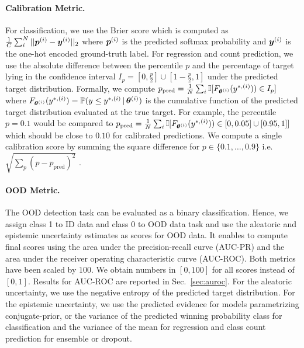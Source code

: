 \paragraph{Calibration Metric.} For classification, we use the Brier score which is computed as $\frac{1}{C}\sum^{N}_i ||\bm{p}^{(i)} - \bm{y}^{(i)}||_2$ where $\bm{p}^{(i)}$ is the predicted softmax probability and $\bm{y}^{(i)}$ is the one-hot encoded ground-truth label. For regression and count prediction, we use the absolute difference between the percentile $p$ and the percentage of target lying in the confidence interval $I_p=[0,\frac{p}{2}]\cup[1-\frac{p}{2},1]$ under the predicted target distribution. Formally, we compute $p_\text{pred} = \frac{1}{N}\sum_i \mathbb{I}[F_{\bm{\theta}^{(i)}}( y^{*, (i)})) \in I_p]$ where $F_{\bm{\theta}^{(i)}}(y^{*, (i)})=\mathbb{P}(y \leq y^{*, (i)} \,|\, \bm{\theta}^{(i)})$ is the cumulative function of the predicted target distribution evaluated at the true target. For example, the percentile $p=0.1$ would be compared to $p_\text{pred} = \frac{1}{N}\sum_i \mathbb{I}[F_{\bm{\theta}^{(i)}}( y^{*, (i)})) \in [0, 0.05] \cup [0.95, 1]]$ which should be close to $0.10$ for calibrated predictions. We compute a single calibration score by summing the square difference for $p \in \{0.1, \ldots, 0.9\}$ i.e.  $\sqrt{\sum_p (p - p_\text{pred})^2}$ \citep{accurate-uncertainties-deep-learning-regression}. 

\paragraph{OOD Metric.} The OOD detection task can be evaluated as a binary classification. Hence, we assign class 1 to ID data and class 0 to OOD data task and use the aleatoric and epistemic uncertainty estimates as scores for OOD data. It enables to compute final scores using the area under the precision-recall curve (AUC-PR) and the area under the receiver operating characteristic curve (AUC-ROC). Both metrics have been scaled by $100$. We obtain numbers in $[0, 100]$  for all scores instead of $[0, 1]$. Results for AUC-ROC are reported in Sec.~\ref{sec:auroc}. For the aleatoric uncertainty, we use the negative entropy of the predicted target distribution. For the epistemic uncertainty, we use the predicted evidence for models parametrizing conjugate-prior, or the variance of the predicted winning probability class for classification and the variance of the mean for regression and class count prediction for ensemble or dropout.

